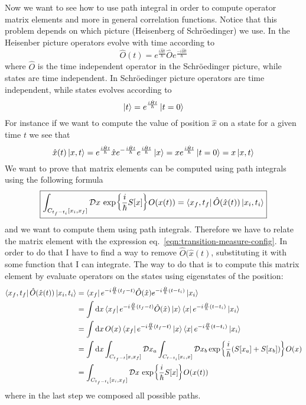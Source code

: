 \documentclass[../main/main.tex]{subfiles}
\begin{document}
Now we want to see how to use path integral in order to compute operator matrix elements and more in general correlation functions. Notice that this problem depends on which picture (Heisenberg of Schröedinger) we use. In the Heisenber picture operators evolve with time according to
\[\hat O(t)=e^{\frac{i\hat Ht}{\hbar}}\hat Oe^{\frac{-i\hat Ht}{\hbar}}\]
where $\hat O$ is the time independent operator in the Schröedinger picture, while states are time independent. In Schröedinger picture operators are time independent, while states evolves according to
\[\ket t=e^{\frac{i\hat Ht}{\hbar}}\ket{t=0}\]
For instance if we want to compute the value of position $\hat x$ on a state for a given time $t$ we see that
\[\hat x(t)\ket{x,t}=e^{\frac{i\hat Ht}{\hbar}}\hat xe^{-\frac{i\hat Ht}{\hbar}}e^{\frac{i\hat Ht}{\hbar}}\ket{x}=xe^{\frac{i\hat Ht}{\hbar}}\ket{t=0}=x\ket{x,t}\]
We want to prove that matrix elements can be computed using path integrals using the following formula
\begin{equation}\boxed{
\int_{C_{t_f-t_i}[x_i,x_f]}\mathcal Dx\,\exp{\frac i\hbar S[x]}O(x(t))=\bra{x_f,t_f}\hat O(\hat x(t))\ket{x_i,t_i}
}\end{equation}
and we want to compute them using path integrals. Therefore we have to relate the matrix element with the expression eq.~\eqref{eqn:transition-measure-config}. In order to do that I have to find a way to remove $\hat O(\hat x(t)$, substituting it with some function that I can integrate. The way to do that is to compute this matrix element by evaluate operators on the states using eigenstates of the position:
\begin{equation}\label{eqn:matrix-element-to-path-integral}\begin{split}
\bra{x_f,t_f}\hat O(\hat x(t))\ket{x_i,t_i}
&=\bra{x_f}e^{-i\frac{\hat H}{\hbar}(t_f-t)}\hat O(\hat x)e^{-i\frac{\hat H}{\hbar}(t-t_i)}\ket{x_i}\\
&=\int\textup{d} x\bra{x_f}e^{-i\frac{\hat H}{\hbar}(t_f-t)}\hat O(\hat x)\ket x\bra xe^{-i\frac{\hat H}{\hbar}(t-t_i)}\ket{x_i}\\
&=\int\textup{d} x\,O(x)\bra{x_f}e^{-i\frac{\hat H}{\hbar}(t_f-t)}\ket x\bra xe^{-i\frac{\hat H}{\hbar}(t-t_i)}\ket{x_i}\\
&=\int\textup{d} x\int_{C_{t_f-t}[x,x_f]}\mathcal Dx_a\int_{C_{t-t_i}[x_i,x]}\mathcal Dx_b\exp{\frac i\hbar(S[x_a]+S[x_b])}O(x)\\
&=\int_{C_{t_f-t_i}[x_i,x_f]}\mathcal Dx\,\exp{\frac i\hbar S[x]}O(x(t))
\end{split}\end{equation}
where in the last step we composed all possible paths.
\end{document}

